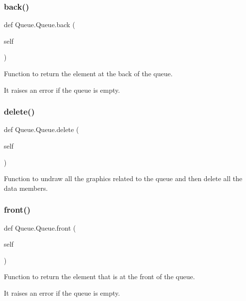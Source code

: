 \subsubsection{\texorpdfstring{back()}{back()}}
{\footnotesize\ttfamily def Queue.\+Queue.\+back (\begin{DoxyParamCaption}\item[{}]{self }\end{DoxyParamCaption})}



Function to return the element at the back of the queue. 

It raises an error if the queue is empty. \mbox{\label{class_queue_1_1_queue_ac384b9efaf5e8d9b1b7a34183062468c}} 
\subsubsection{\texorpdfstring{delete()}{delete()}}
{\footnotesize\ttfamily def Queue.\+Queue.\+delete (\begin{DoxyParamCaption}\item[{}]{self }\end{DoxyParamCaption})}



Function to undraw all the graphics related to the queue and then delete all the data members. 

\mbox{\label{class_queue_1_1_queue_a7d3ec12e83314c6a109e8403b9250c30}} 
\subsubsection{\texorpdfstring{front()}{front()}}
{\footnotesize\ttfamily def Queue.\+Queue.\+front (\begin{DoxyParamCaption}\item[{}]{self }\end{DoxyParamCaption})}



Function to return the element that is at the front of the queue. 

It raises an error if the queue is empty. \mbox{\label{class_queue_1_1_queue_a192c71ff5839f8b1970976eefaaec777}} 
